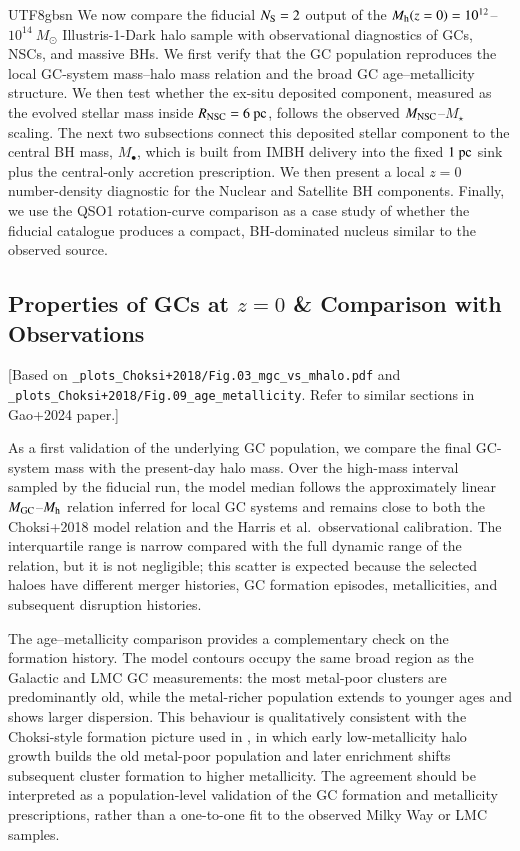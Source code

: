 \documentclass[trackchanges, twocolappendix, twocolumn]{aastex701}
\newcommand{\czkong}[1]{{\color{magenta}#1}}
\begin{document}
\begin{CJK*}{UTF8}{gbsn}
We now compare the fiducial $N_{\rm S}=2$ output of the $M_{\rm h}(z=0)=10^{12}$--$10^{14}~M_\odot$ Illustris-1-Dark halo sample with observational diagnostics of GCs, NSCs, and massive BHs. We first verify that the GC population reproduces the local GC-system mass--halo mass relation and the broad GC age--metallicity structure. We then test whether the ex-situ deposited component, measured as the evolved stellar mass inside $R_{\rm NSC}=6~{\rm pc}$, follows the observed $M_{\rm NSC}$--$M_\star$ scaling. The next two subsections connect this deposited stellar component to the central BH mass, $M_\bullet$, which is built from IMBH delivery into the fixed $1~{\rm pc}$ sink plus the central-only accretion prescription. We then present a local $z=0$ number-density diagnostic for the Nuclear and Satellite BH components. Finally, we use the QSO1 rotation-curve comparison as a case study of whether the fiducial catalogue produces a compact, BH-dominated nucleus similar to the observed source.

\subsection{Properties of GCs at $z = 0$ \& Comparison with Observations} \label{subsect:check}

\czkong{[Based on \texttt{\_plots\_Choksi+2018/Fig.03\_mgc\_vs\_mhalo.pdf} and \texttt{\_plots\_Choksi+2018/Fig.09\_age\_metallicity}. Refer to similar sections in Gao+2024 paper.]}

As a first validation of the underlying GC population, we compare the final GC-system mass with the present-day halo mass. Over the high-mass interval sampled by the fiducial run, the model median follows the approximately linear $M_{\rm GC}$--$M_{\rm h}$ relation inferred for local GC systems and remains close to both the Choksi+2018 model relation and the Harris et al.\ observational calibration. The interquartile range is narrow compared with the full dynamic range of the relation, but it is not negligible; this scatter is expected because the selected haloes have different merger histories, GC formation episodes, metallicities, and subsequent disruption histories.

The age--metallicity comparison provides a complementary check on the formation history. The model contours occupy the same broad region as the Galactic and LMC GC measurements: the most metal-poor clusters are predominantly old, while the metal-richer population extends to younger ages and shows larger dispersion. This behaviour is qualitatively consistent with the Choksi-style formation picture used in \citet{Gao+2024GC}, in which early low-metallicity halo growth builds the old metal-poor population and later enrichment shifts subsequent cluster formation to higher metallicity. The agreement should be interpreted as a population-level validation of the GC formation and metallicity prescriptions, rather than a one-to-one fit to the observed Milky Way or LMC samples.


\end{CJK*}
\end{document}
